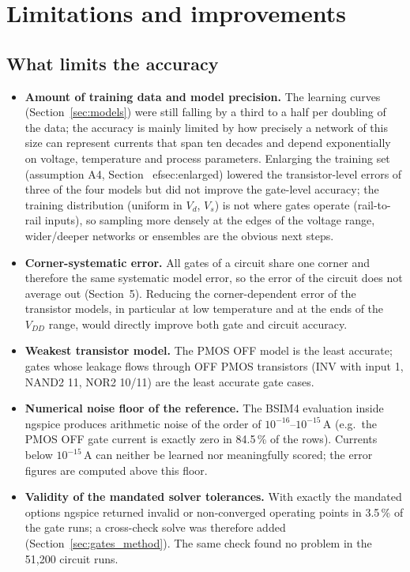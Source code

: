\section{Limitations and improvements}\label{sec:limits}
\subsection{What limits the accuracy}
\begin{itemize}
  \item \textbf{Amount of training data and model precision.} The learning curves (Section~\ref{sec:models}) were still falling by a third to a half per doubling of the data; the accuracy is mainly limited by how precisely a network of this size can represent
        currents that span ten decades and depend exponentially on voltage, temperature and process parameters. Enlarging the training set (assumption A4, Section~
ef{sec:enlarged}) lowered the transistor-level errors of three of the four models but did not improve the gate-level accuracy; the training distribution (uniform in $V_d$, $V_s$) is not where gates operate (rail-to-rail inputs), so sampling more densely at the edges of the voltage range, wider/deeper networks or ensembles are the obvious next steps.
  \item \textbf{Corner-systematic error.} All gates of a circuit share one corner and therefore the same systematic model error, so the error of the circuit does not average out (Section~5). Reducing the corner-dependent error of the transistor models, in particular at low temperature and at the ends of the $V_{DD}$ range, would directly improve both gate and circuit accuracy.
  \item \textbf{Weakest transistor model.} The PMOS OFF model is the least accurate; gates whose leakage flows through OFF PMOS transistors (INV with input 1, NAND2 11, NOR2 10/11) are the least accurate gate cases.
  \item \textbf{Numerical noise floor of the reference.} The BSIM4 evaluation inside ngspice produces arithmetic noise of the order of $10^{-16}$--$10^{-15}$\,A (e.g.\ the PMOS OFF gate current is exactly zero in 84.5\,\% of the rows). Currents below $10^{-15}$\,A can neither be learned nor meaningfully scored; the error figures are computed above this floor.
  \item \textbf{Validity of the mandated solver tolerances.} With exactly the mandated options ngspice returned invalid or non-converged operating points in 3.5\,\% of the gate runs; a cross-check solve was therefore added (Section~\ref{sec:gates_method}). The same check found no problem in the 51{,}200 circuit runs.

\end{itemize}

